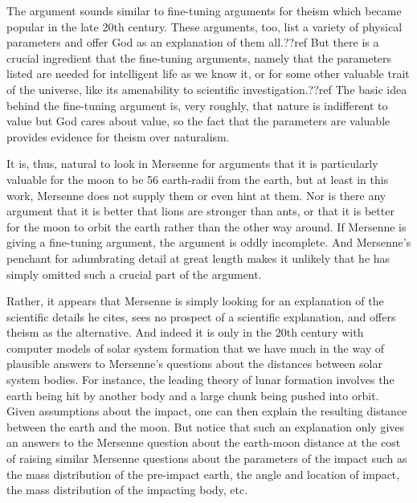 The argument sounds similar to fine-tuning arguments for theism which became popular in the late 20th century. These
arguments, too, list a variety of physical parameters and offer God as an explanation of them all.??ref But there is
a crucial ingredient that the fine-tuning arguments, namely that the parameters listed are needed for intelligent life
as we know it, or for some other valuable trait of the universe, like its amenability to scientific investigation.??ref
The basic idea behind the fine-tuning argument is, very roughly, that nature is indifferent to value but God cares 
about value, so the fact that the parameters are valuable provides evidence for theism over naturalism.

It is, thus, natural to look in Mersenne for arguments that it is particularly valuable for the moon to be 56 earth-radii
from the earth, but at least in this work, Mersenne does not supply them or even hint at them. Nor is there any argument
that it is better that lions are stronger than ants, or that it is better for the moon to orbit the earth rather than
the other way around. If Mersenne is giving a fine-tuning argument, the argument is oddly incomplete. And Mersenne's
penchant for adumbrating detail at great length makes it unlikely that he has simply omitted such a crucial part of the
argument.

Rather, it appears that Mersenne is simply looking for an explanation of the scientific details he cites, sees no
prospect of a scientific explanation, and offers theism as the alternative. And indeed it is only in the 20th century
with computer models of solar system formation that we have much in the way of plausible answers to Mersenne's questions
about the distances between solar system bodies. For instance, the leading theory of lunar formation involves the earth being hit by
another body and a large chunk being pushed into orbit. Given assumptions about the impact, one can then explain the
resulting distance between the earth and the moon. But notice that such an explanation only gives an answers to the 
Mersenne question about the earth-moon distance at the cost of raising similar Mersenne questions about the 
parameters of the impact such as the mass distribution of the pre-impact earth, the angle and location of impact, the 
mass distribution of the impacting body, etc.

